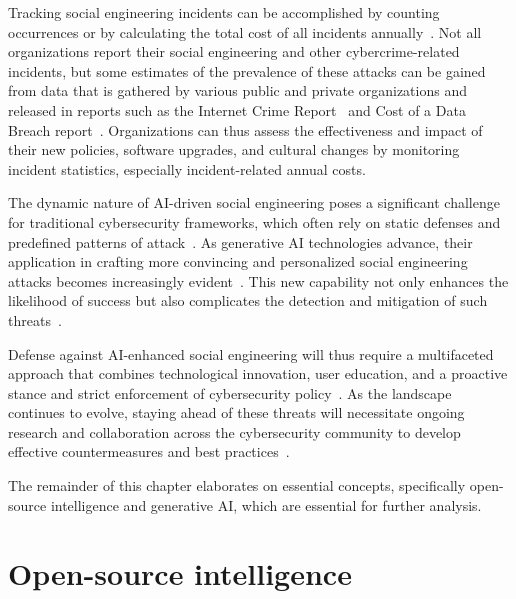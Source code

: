 %
%
Tracking social engineering incidents can be accomplished by counting occurrences or by calculating the total cost of all incidents annually~\citep{ibm_Cost_Data_Breach_Report_2024}. Not all organizations report their social engineering and other cybercrime-related incidents, but some estimates of the prevalence of these attacks can be gained from data that is gathered by various public and private organizations and released in reports such as the Internet Crime Report~\citep{fbi_Internet_Crime_Report_2023} and Cost of a Data Breach report~\citep{ibm_Cost_Data_Breach_Report_2024}. Organizations can thus assess the effectiveness and impact of their new policies, software upgrades, and cultural changes by monitoring incident statistics, especially incident-related annual costs.




%
%
The dynamic nature of AI-driven social engineering poses a significant challenge for traditional cybersecurity frameworks, which often rely on static defenses and predefined patterns of attack~\citep{fakhouri_AI_Driven_Solutions_SE_Attacks_2024}. As generative AI technologies advance, their application in crafting more convincing and personalized social engineering attacks becomes increasingly evident~\citep{blauth_AI_Crime_Overview_Malicious_Use_Abuse_2022}. This new capability not only enhances the likelihood of success but also complicates the detection and mitigation of such threats~\citep{mirsky_Threat_Offensive_AI_Organizations_2023}.



%
%
Defense against AI-enhanced social engineering will thus require a multifaceted approach that combines technological innovation, user education, and a proactive stance and strict enforcement of cybersecurity policy~\citep{blauth_AI_Crime_Overview_Malicious_Use_Abuse_2022}. As the landscape continues to evolve, staying ahead of these threats will necessitate ongoing research and collaboration across the cybersecurity community to develop effective countermeasures and best practices~\citep{fakhouri_AI_Driven_Solutions_SE_Attacks_2024}.



%
%
The remainder of this chapter elaborates on essential concepts, specifically open-source intelligence and generative AI, which are essential for further analysis.




\section{Open-source intelligence}
\begin{comment}
Some case studies highlighting the use of OSINT in real-world social engineering incidents?
\end{comment}


